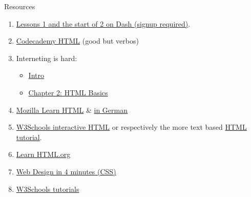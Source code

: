 \begin{frame}{Resources}
\small{}
\begin{enumerate}
    \item \href{https://dash.generalassemb.ly/projects}{Lessons 1 and the start of 2 on Dash (signup required)}. 
    \item \href{https://www.codecademy.com/learn/learn-html}{Codecademy HTML} (good but verbos)
    \item Interneting is hard:
    \begin{itemize}\footnotesize
        \item \href{https://internetingishard.com/html-and-css/introduction/}{Intro} 
        \item \href{https://internetingishard.com/html-and-css/basic-web-pages/}{Chapter 2: HTML Basics}
    \end{itemize}
    \item \href{https://developer.mozilla.org/en-US/docs/Learn/HTML/Introduction_to_HTML/Getting_started}{Mozilla Learn HTML} \& \href{https://developer.mozilla.org/de/docs/Learn/HTML}{in German}
    \item \href{https://www.w3schools.com/html/exercise.asp}{W3Schools interactive HTML} or respectively the more text based \href{https://www.w3schools.com/html/default.asp}{HTML tutorial}. 
    \item \href{https://www.learn-html.org/en/Basic_Elements}{Learn HTML.org} 
    \item \href{https://jgthms.com/web-design-in-4-minutes/}{Web Design in 4 minutes (CSS)}
    \item \href{https://www.w3schools.com/html/html_responsive.asp}{W3Schools tutorials}
\end{enumerate}

\end{frame}


